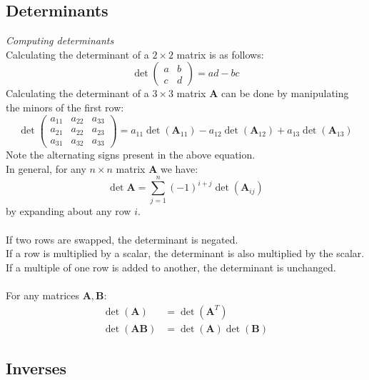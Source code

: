 \documentclass{scrartcl}
\renewcommand{\vec}[1]{\mathbf{#1}}
\begin{document}
\subsection{Determinants}

\textit{Computing determinants}
\\
Calculating the determinant of a $ 2 \times 2 $ matrix is as follows:
\begin{equation}
\det \begin{pmatrix}
a & b \\ c & d
\end{pmatrix}
= ad - bc
\end{equation}
Calculating the determinant of a $ 3 \times 3 $ matrix $ \vec{A} $ can be done by manipulating the minors of the first row:
\begin{equation}
\det \begin{pmatrix}
a_{11} & a_{22} & a_{33} \\ a_{21} & a_{22} & a_{23} \\ a_{31} & a_{32} & a_{33}
\end{pmatrix}
=
a_{11} \det (\vec{A}_{11}) - a_{12} \det (\vec{A}_{12}) + a_{13} \det (\vec{A}_{13})
\end{equation}
Note the alternating signs present in the above equation.
\\
In general, for any $ n \times n $ matrix $ \vec{A} $ we have:
\begin{equation}
\det \vec{A} = \sum_{j=1}^{n} (-1)^{i+j} \det (\vec{A}_{ij})
\end{equation}
by expanding about any row $ i $.
\\\\
If two rows are swapped, the determinant is negated.
\\
If a row is multiplied by a scalar, the determinant is also multiplied by the scalar.
\\
If a multiple of one row is added to another, the determinant is unchanged.
\\\\
For any matrices $ \vec{A}, \vec{B} $:
\begin{align}
\det (\vec{A}) & = \det (\vec{A}^{T}) \\
\det (\vec{AB}) & = \det (\vec{A}) \det (\vec{B})
\end{align}

\subsection{Inverses}
\end{document}

